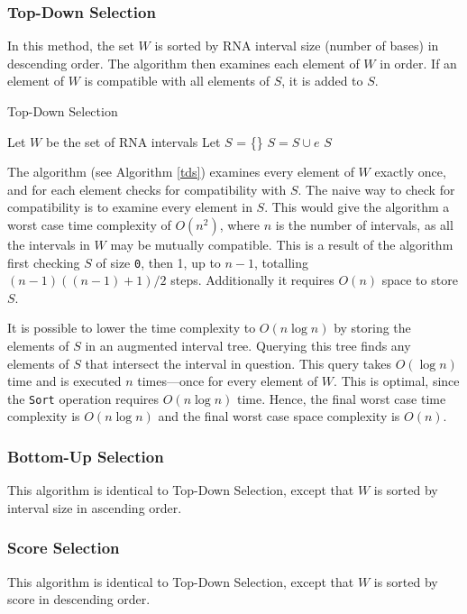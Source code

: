 \documentclass{cshonours}
\begin{document}
\subsubsection{Top-Down Selection}
In this method, the set $W$ is sorted by RNA interval size (number of bases) in descending order. The algorithm then examines each element of $W$ in order. If an element of $W$ is compatible with all elements of $S$, it is added to $S$.

\begin{algorithm}
  \caption{Top-Down Selection}
  \label{tds}
  \begin{algorithmic}[1]
  \State Let $W$ be the set of RNA intervals
  \State Let $S$ = \{\}
  \State {}
  		\State $S = S \cup e$
  	\EndIf
  \EndFor
  \State \Return $S$
  \end{algorithmic}
\end{algorithm}

	
The algorithm (see Algorithm \ref{tds}) examines every element of $W$ exactly once, and for each element checks for compatibility with $S$. The naive way to check for compatibility is to examine every element in $S$. This would give the algorithm a worst case time complexity of $O(n^2)$, where $n$ is the number of intervals, as all the intervals in $W$ may be mutually compatible. This is a result of the algorithm first checking $S$ of size \texttt{0}, then 1, up to $n-1$, totalling $(n-1)((n-1)+1) / 2$ steps. Additionally it requires $O(n)$ space to store $S$.

It is possible to lower the time complexity to $O(n \log n)$ by storing the elements of $S$ in an augmented interval tree. Querying this tree finds any elements of $S$ that intersect the interval in question. This query takes $O(\log n)$ time and is executed $n$ times---once for every element of $W$. This is optimal, since the \texttt{Sort} operation requires $O(n \log n)$ time. Hence, the final worst case time complexity is $O(n \log n)$ and the final worst case space complexity is $O(n)$.


\subsubsection{Bottom-Up Selection}
This algorithm is identical to Top-Down Selection, except that $W$ is sorted by interval size in ascending order.

\subsubsection{Score Selection}
This algorithm is identical to Top-Down Selection, except that $W$ is sorted by score in descending order.
\end{document}
